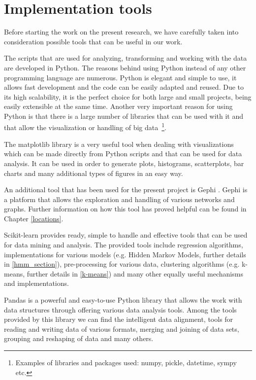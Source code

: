 \section{Implementation tools}
Before starting the work on the present research, we have carefully taken into
consideration possible tools that can be useful in our work.

The scripts that are used for analyzing, transforming and working with the data
are developed in Python. The reasons behind using Python instead of any other
programming language are numerous. Python is elegant and simple to use, it
allows fast development and the code can be easily adapted and reused. Due to
its high scalability, it is the perfect choice for both large and small
projects, being easily extensible at the same time. Another very important
reason for using Python is that there is a large number of libraries that can be
used with it and that allow the visualization or handling of big
data~\footnote{Examples of libraries and packages used: numpy, pickle,
datetime, sympy etc.}.

The matplotlib library \cite{Mplib} is a very useful tool when dealing with
visualizations which can be made directly from Python scripts and that can be
used for data analysis. It can be used in order to generate plots, histograms,
scatterplots, bar charts and many additional types of figures in an easy way.

An additional tool that has been used for the present project is Gephi
\cite{Gephi}. Gephi is a platform that allows the exploration and handling of
various networks and graphs. Further information on how this tool has proved
helpful can be found in Chapter \ref{locations}.

Scikit-learn \cite{SL} provides ready, simple to handle and effective tools that
can be used for data mining and analysis. The provided tools include regression
algorithms, implementations for various models (e.g. Hidden Markov Models,
further details in \ref{hmm_section}), pre-processing for various data,
clustering algorithms (e.g. k-means, further details in \ref{k-means}) and many
other equally useful mechanisms and implementations.

Pandas \cite{Pandas} is a powerful and easy-to-use Python library that allows
the work with data structures through offering various data analysis tools.
Among the tools provided by this library we can find the intelligent data
alignment, tools for reading and writing data of various formats, merging and
joining of data sets, grouping and reshaping of data and many others.